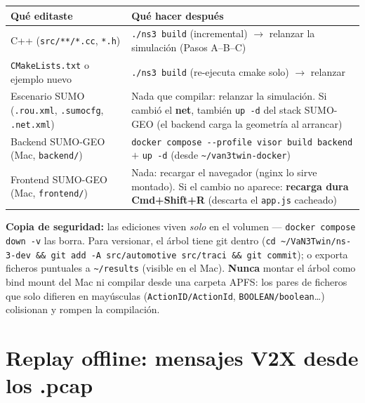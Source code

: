 \documentclass[11pt,a4paper]{article}
\begin{document}
\begin{center}
\small
\begin{tabular}{@{}p{}p{}@{}}
\toprule
\textbf{Qué editaste} & \textbf{Qué hacer después} \\
\midrule
C++ (\texttt{src/**/*.cc}, \texttt{*.h}) & \texttt{./ns3 build} (incremental) $\rightarrow$ relanzar la simulación (Pasos A--B--C) \\
\texttt{CMakeLists.txt} o ejemplo nuevo & \texttt{./ns3 build} (re-ejecuta cmake solo) $\rightarrow$ relanzar \\
Escenario SUMO (\texttt{.rou.xml}, \texttt{.sumocfg}, \texttt{.net.xml}) & Nada que compilar: relanzar la simulación. Si cambió el \textbf{net}, también \texttt{up -d} del stack SUMO-GEO (el backend carga la geometría al arrancar) \\
Backend SUMO-GEO (Mac, \texttt{backend/}) & \texttt{docker compose -{}-profile visor build backend} $+$ \texttt{up -d} (desde \texttt{\textasciitilde/van3twin-docker}) \\
Frontend SUMO-GEO (Mac, \texttt{frontend/}) & Nada: recargar el navegador (nginx lo sirve montado). Si el cambio no aparece: \textbf{recarga dura \textsf{Cmd+Shift+R}} (descarta el \texttt{app.js} cacheado) \\
\bottomrule
\end{tabular}
\end{center}

\begin{advertenciabox}
\textbf{Copia de seguridad:} las ediciones viven \emph{solo} en el volumen ---
\texttt{docker compose down -v} las borra. Para versionar, el árbol tiene git
dentro (\texttt{cd \textasciitilde/VaN3Twin/ns-3-dev \&\& git add -A
src/automotive src/traci \&\& git commit}); o exporta ficheros puntuales a
\texttt{\textasciitilde/results} (visible en el Mac). \textbf{Nunca} montar el
árbol como bind mount del Mac ni compilar desde una carpeta APFS: los pares de
ficheros que solo difieren en mayúsculas (\texttt{ActionID/ActionId},
\texttt{BOOLEAN/boolean}\ldots) colisionan y rompen la compilación.
\end{advertenciabox}

\section{Replay offline: mensajes V2X desde los .pcap}
\end{document}
